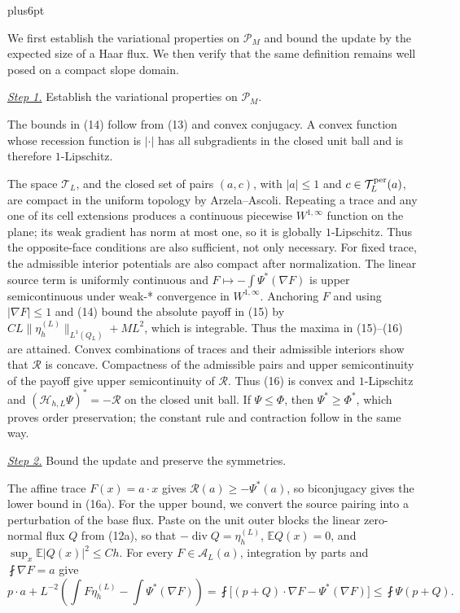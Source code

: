 \documentclass[11pt,reqno]{amsart}
\makeatletter
\theoremstyle{plain}
\theoremstyle{definition}
\theoremstyle{remark}
\renewenvironment{proof}[1][\proofname]{%
  \par
  \pushQED{\qed}%
  \normalfont
  \topsep6pt plus6pt\relax
  \trivlist
  \item[\hskip\labelsep\slshape #1\@addpunct{.}]%
  \ignorespaces
}{%
  \popQED
  \endtrivlist
  \@endpefalse
}
\DeclareRobustCommand{\qed}{%
  \leavevmode\unskip\penalty9999\hbox{}\nobreak
  \ifmmode
    \makebox[0pt][l]{\qquad\hbox{\qedsymbol}}%
  \else
    \qquad\hbox{\qedsymbol}%
  \fi
}
\renewcommand{\qedsymbol}{\rule[.47pt]{4pt}{6pt}}
\numberwithin{equation}{section}
\newcommand{\1}{\mathbf 1}
\makeatother
\begin{document}
\begin{proof}
We first establish the variational properties on $\mathscr P_M$ and
bound the update by the expected size of a Haar flux.  We then verify
that the same definition remains well posed on a compact slope domain.

\smallskip\noindent
\underline{\textit{Step 1.}} Establish the variational properties on $\mathscr P_M$.

The bounds in (14) follow from (13) and convex conjugacy. A convex
function whose recession function is $|\cdot|$ has all subgradients in
the closed unit ball and is therefore $1$-Lipschitz.

The space $\mathcal T_ L$, and the closed set of pairs $(a,c)$, with
$|a|\leq1$ and $c\in\mathcal T_ L^{\rm per}(a)$, are compact in the
uniform topology by Arzela--Ascoli.  Repeating a trace and any one of its
cell extensions produces a continuous piecewise $W^{1,\infty}$ function
on the plane; its weak gradient has norm at most one, so it is globally
$1$-Lipschitz.  Thus the opposite-face conditions are also sufficient,
not only necessary.  For fixed trace, the admissible interior potentials are
also compact after normalization.  The linear source term is uniformly
continuous and $F\mapsto-\int\Psi^*(\nabla F)$ is upper
semicontinuous under weak-* convergence in $W^{1,\infty}$.  Anchoring
$F$ and using $|\nabla F|\leq1$ and (14) bound the absolute payoff in
(15) by $CL\|\eta_h^{(L)}\|_{L^1(Q_L)}+ML^2$, which is integrable.
Thus the maxima in (15)--(16) are attained.  Convex combinations of
traces and their admissible interiors show that $\mathcal R$ is concave.
Compactness of the admissible pairs and upper semicontinuity of the
payoff give upper semicontinuity of $\mathcal R$.  Thus (16) is convex
and $1$-Lipschitz and
$(\mathcal H_ {h,L}\Psi)^*=-\mathcal R$ on the closed unit ball.  If
$\Psi\leq\Phi$, then $\Psi^*\geq\Phi^*$, which proves order
preservation; the constant rule and contraction follow in the same way.

\smallskip\noindent
\underline{\textit{Step 2.}} Bound the update and preserve the symmetries.

The affine trace $F(x)=a\cdot x$ gives
$\mathcal R(a)\geq-\Psi^*(a)$, so biconjugacy gives the lower bound in
(16a).  For the upper bound, we convert the source pairing into a perturbation
of the base flux.  Paste on the unit outer blocks the linear zero-normal
flux $Q$ from (12a), so that
$-\operatorname {div}Q=\eta_ h^{(L)}$,
$\mathbb E Q(x)=0$, and
$\sup_ x\mathbb E|Q(x)|^2\leq Ch$.  For every $F\in\mathcal A_L(a)$,
integration by parts and
$\fint\nabla F=a$ give
\begin{equation}
p\cdot a+L^{-2}\left(\int F\eta_ h^{(L)}-
\int\Psi^*(\nabla F)\right)
=\fint\bigl[(p+Q)\cdot\nabla F-\Psi^*(\nabla F)\bigr]
\leq\fint\Psi(p+Q).
\tag{16b}
\end{equation}


\end{proof}
\end{document}
